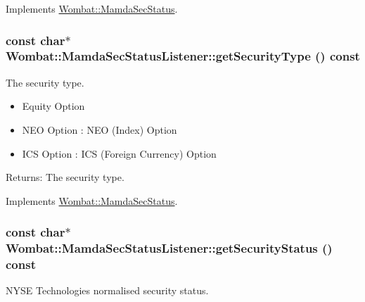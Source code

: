 Implements \hyperlink{classWombat_1_1MamdaSecStatus_018c6d2c254aa4534d75b37a2d162061}{Wombat::Mamda\-Sec\-Status}.\hypertarget{classWombat_1_1MamdaSecStatusListener_2f643f3f70d52943af0b2ac011c1fa3b}{
\subsubsection[getSecurityType]{\setlength{\rightskip}{0pt plus 5cm}const char$\ast$ Wombat::Mamda\-Sec\-Status\-Listener::get\-Security\-Type () const}}
\label{classWombat_1_1MamdaSecStatusListener_2f643f3f70d52943af0b2ac011c1fa3b}


The security type. 

\begin{itemize}
\item Equity Option \item NEO Option : NEO (Index) Option \item ICS Option : ICS (Foreign Currency) Option \end{itemize}


\begin{Desc}
\item[Returns:]The security type. \end{Desc}


Implements \hyperlink{classWombat_1_1MamdaSecStatus_d3f39139bb90453ba077440f838b3d70}{Wombat::Mamda\-Sec\-Status}.\hypertarget{classWombat_1_1MamdaSecStatusListener_b1b6d523017888af27f4c3745c2e7fc0}{
\subsubsection[getSecurityStatus]{\setlength{\rightskip}{0pt plus 5cm}const char$\ast$ Wombat::Mamda\-Sec\-Status\-Listener::get\-Security\-Status () const}}
\label{classWombat_1_1MamdaSecStatusListener_b1b6d523017888af27f4c3745c2e7fc0}


NYSE Technologies normalised security status. 

